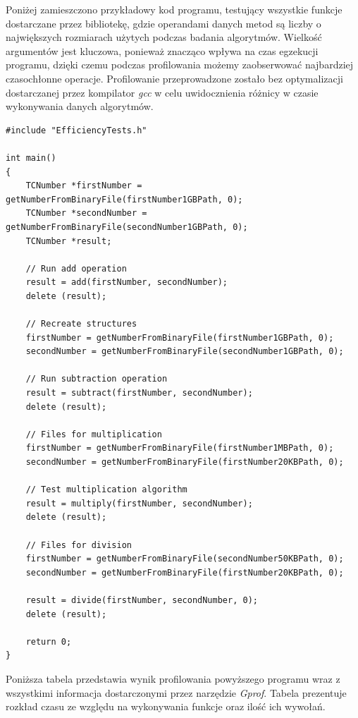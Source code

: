 \documentclass{article}
\begin{document}
Poniżej zamieszczono przykładowy kod programu, testujący wszystkie funkcje dostarczane przez bibliotekę, gdzie operandami danych metod są liczby o największych rozmiarach użytych podczas badania algorytmów. Wielkość argumentów jest kluczowa, ponieważ znacząco wpływa na czas egzekucji programu, dzięki czemu podczas profilowania możemy zaobserwować najbardziej czasochłonne operacje. Profilowanie przeprowadzone zostało bez optymalizacji dostarczanej przez kompilator \textit{gcc} w celu uwidocznienia różnicy w czasie wykonywania danych algorytmów.

\newpage

\begin{verbatim}
#include "EfficiencyTests.h"

int main()
{
    TCNumber *firstNumber = getNumberFromBinaryFile(firstNumber1GBPath, 0);
    TCNumber *secondNumber = getNumberFromBinaryFile(secondNumber1GBPath, 0);
    TCNumber *result;

    // Run add operation
    result = add(firstNumber, secondNumber);
    delete (result);

    // Recreate structures
    firstNumber = getNumberFromBinaryFile(firstNumber1GBPath, 0);
    secondNumber = getNumberFromBinaryFile(secondNumber1GBPath, 0);

    // Run subtraction operation
    result = subtract(firstNumber, secondNumber);
    delete (result);

    // Files for multiplication
    firstNumber = getNumberFromBinaryFile(firstNumber1MBPath, 0);
    secondNumber = getNumberFromBinaryFile(firstNumber20KBPath, 0);

    // Test multiplication algorithm
    result = multiply(firstNumber, secondNumber);
    delete (result);

    // Files for division
    firstNumber = getNumberFromBinaryFile(secondNumber50KBPath, 0);
    secondNumber = getNumberFromBinaryFile(firstNumber20KBPath, 0);

    result = divide(firstNumber, secondNumber, 0);
    delete (result);

    return 0;
}

\end{verbatim}

\clearpage{}

Poniższa tabela przedstawia wynik profilowania powyższego programu wraz z wszystkimi informacja dostarczonymi przez narzędzie \textit{Gprof}. Tabela prezentuje rozkład czasu ze względu na wykonywania funkcje oraz ilość ich wywołań.
\end{document}
